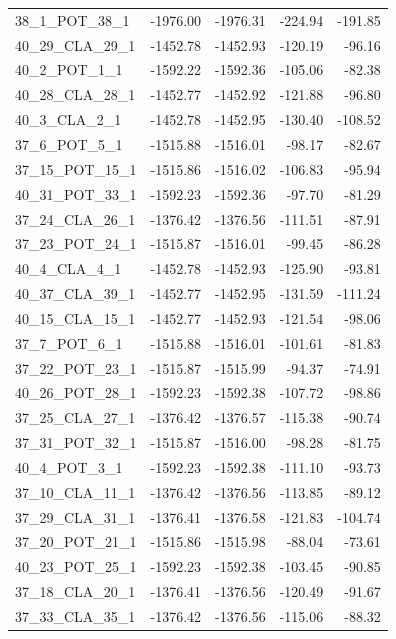 \documentclass[journal=jacsat,manuscript=article]{achemso}
\begin{document}
\begin{table}[b!]
\begin{tabular}{lrrrr}
38\_1\_POT\_38\_1  &  -1976.00 &  -1976.31 & -224.94 & -191.85 \\
40\_29\_CLA\_29\_1 &  -1452.78 &  -1452.93 & -120.19 &  -96.16 \\
40\_2\_POT\_1\_1   &  -1592.22 &  -1592.36 & -105.06 &  -82.38 \\
40\_28\_CLA\_28\_1 &  -1452.77 &  -1452.92 & -121.88 &  -96.80 \\
40\_3\_CLA\_2\_1   &  -1452.78 &  -1452.95 & -130.40 & -108.52 \\
37\_6\_POT\_5\_1   &  -1515.88 &  -1516.01 &  -98.17 &  -82.67 \\
37\_15\_POT\_15\_1 &  -1515.86 &  -1516.02 & -106.83 &  -95.94 \\
40\_31\_POT\_33\_1 &  -1592.23 &  -1592.36 &  -97.70 &  -81.29 \\
37\_24\_CLA\_26\_1 &  -1376.42 &  -1376.56 & -111.51 &  -87.91 \\
37\_23\_POT\_24\_1 &  -1515.87 &  -1516.01 &  -99.45 &  -86.28 \\
40\_4\_CLA\_4\_1   &  -1452.78 &  -1452.93 & -125.90 &  -93.81 \\
40\_37\_CLA\_39\_1 &  -1452.77 &  -1452.95 & -131.59 & -111.24 \\
40\_15\_CLA\_15\_1 &  -1452.77 &  -1452.93 & -121.54 &  -98.06 \\
37\_7\_POT\_6\_1   &  -1515.88 &  -1516.01 & -101.61 &  -81.83 \\
37\_22\_POT\_23\_1 &  -1515.87 &  -1515.99 &  -94.37 &  -74.91 \\
40\_26\_POT\_28\_1 &  -1592.23 &  -1592.38 & -107.72 &  -98.86 \\
37\_25\_CLA\_27\_1 &  -1376.42 &  -1376.57 & -115.38 &  -90.74 \\
37\_31\_POT\_32\_1 &  -1515.87 &  -1516.00 &  -98.28 &  -81.75 \\
40\_4\_POT\_3\_1   &  -1592.23 &  -1592.38 & -111.10 &  -93.73 \\
37\_10\_CLA\_11\_1 &  -1376.42 &  -1376.56 & -113.85 &  -89.12 \\
37\_29\_CLA\_31\_1 &  -1376.41 &  -1376.58 & -121.83 & -104.74 \\
37\_20\_POT\_21\_1 &  -1515.86 &  -1515.98 &  -88.04 &  -73.61 \\
40\_23\_POT\_25\_1 &  -1592.23 &  -1592.38 & -103.45 &  -90.85 \\
37\_18\_CLA\_20\_1 &  -1376.41 &  -1376.56 & -120.49 &  -91.67 \\
37\_33\_CLA\_35\_1 &  -1376.42 &  -1376.56 & -115.06 &  -88.32 \\

\end{tabular}
\end{table}
\end{document}

